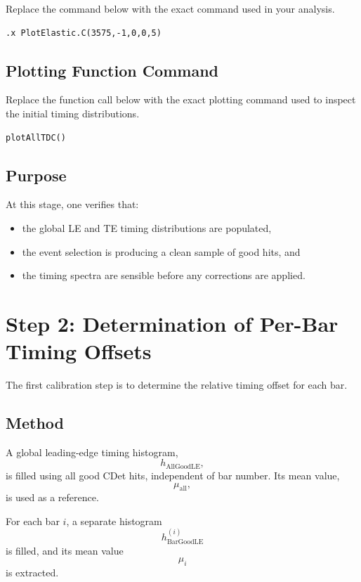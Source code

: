 \documentclass[11pt]{article}
\begin{document}
Replace the command below with the exact command used in your analysis.

\begin{lstlisting}
.x PlotElastic.C(3575,-1,0,0,5)
\end{lstlisting}

\subsection{Plotting Function Command}

Replace the function call below with the exact plotting command used to inspect the initial timing distributions.

\begin{lstlisting}
plotAllTDC()
\end{lstlisting}

\subsection{Purpose}

At this stage, one verifies that:
\begin{itemize}
    \item the global LE and TE timing distributions are populated,
    \item the event selection is producing a clean sample of good hits, and
    \item the timing spectra are sensible before any corrections are applied.
\end{itemize}

\section{Step 2: Determination of Per-Bar Timing Offsets}

The first calibration step is to determine the relative timing offset for each bar.

\subsection{Method}

A global leading-edge timing histogram,
\[
h_{\mathrm{AllGoodLE}},
\]
is filled using all good CDet hits, independent of bar number. Its mean value,
\[
\mu_{\mathrm{all}},
\]
is used as a reference.

For each bar \(i\), a separate histogram
\[
h_{\mathrm{BarGoodLE}}^{(i)}
\]
is filled, and its mean value
\[
\mu_i
\]
is extracted.
\end{document}
